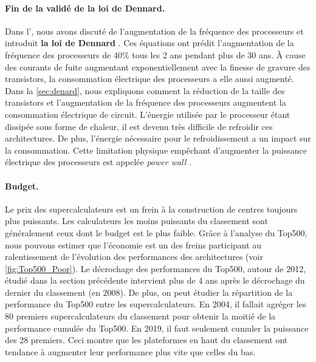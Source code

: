         \paragraph{Fin de la validé de la loi de Dennard.} 
                
            Dans l', nous avons discuté de l'augmentation de la fréquence des processeurs et introduit \textbf{la loi de Dennard} \cite{Dennard1974}. Ces équations ont prédit l'augmentation de la fréquence des processeurs de 40\% tous les 2 ans pendant plus de 30 ans. À cause des courants de fuite \cite{Wulf1995} augmentant exponentiellement avec la finesse de gravure des transistors, la consommation électrique des processeurs a elle aussi augmenté. Dans la \autoref{sec:denard}, nous expliquons comment la réduction de la taille des transistors et l'augmentation de la fréquence des processeurs augmentent la consommation électrique de circuit. L'énergie utilisée par le processeur étant dissipée sous forme de chaleur, il est devenu très difficile de refroidir ces architectures. De plus, l'énergie nécessaire pour le refroidissement a un impact sur la consommation. Cette limitation physique empêchant d'augmenter la puissance électrique des processeurs est appelée \textit{power wall} \cite{Kuroda2001}.

        \paragraph{Budget.} 
            
            Le prix des supercalculateurs est un frein à la construction de centres toujours plus puissants. Les calculateurs les moins puissants du classement sont généralement ceux dont le budget est le plus faible. Grâce à l'analyse du Top500, nous pouvons estimer que l'économie est un des freins participant au ralentissement de l'évolution des performances des architectures (voir \autoref{fig:Top500_Poor}). Le décrochage des performances du Top500, autour de 2012, étudié dans la section précédente intervient plus de 4 ans après le décrochage du dernier du classement (en 2008). De plus, on peut étudier la répartition de la performance du Top500 entre les supercalculateurs. En 2004, il fallait agréger les 80 premiers supercalculateurs du classement pour obtenir la moitié de la performance cumulée du Top500. En 2019, il faut seulement cumuler la puissance des 28 premiers. Ceci montre que les plateformes en haut du classement ont tendance à augmenter leur performance plus vite que celles du bas.
            
